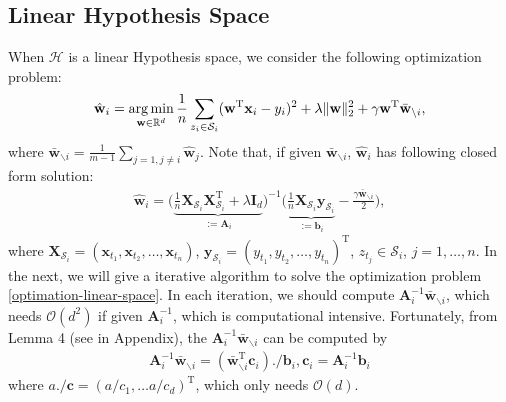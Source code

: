 \documentclass{article}
\newcommand{\argmin}{\operatornamewithlimits{arg\,min}}
\begin{document}
\subsection{Linear Hypothesis Space}
When $\mathcal{H}$ is a linear Hypothesis space,
we consider the following optimization problem:
\begin{align}
 \label{optimation-linear-space}
  \hat{\mathbf w}_i=\argmin_{\mathbf w\in\mathbb{R}^d}
  \frac{1}{n}\sum_{z_i\in\mathcal{S}_i}(\mathbf w^\mathrm{T}\mathbf x_i-y_i)^2+\lambda \|\mathbf w\|_2^2+ \gamma \mathbf w^\mathrm{T}\bar{\mathbf w}_{\backslash i},
\end{align}
where $\bar{\mathbf w}_{\backslash i}=\frac{1}{m-1}\sum_{j=1,j\not =i}\hat{\mathbf w}_j$.
Note that, if given $\bar{\mathbf w}_{\backslash i}$,  $\hat{\mathbf w}_i$ has following closed form solution:
\begin{align*}
  \hat{\mathbf w}_i=\Big(\underbrace{\frac{1}{n}\mathbf X_{\mathcal{S}_i}\mathbf X_{\mathcal{S}_i}^\mathrm{T}+\lambda \mathbf I_d}_{:=\mathbf A_i}\Big)^{-1}
  \Big(\underbrace{\frac{1}{n}\mathbf X_{\mathcal{S}_i}\mathbf y_{\mathcal{S}_i}}_{:=\mathbf b_i}- \frac{\gamma\bar{\mathbf w}_{\backslash i}}{2}\Big),
\end{align*}
where $\mathbf X_{\mathcal{S}_i}=(\mathbf x_{t_1},\mathbf x_{t_2},\ldots, \mathbf x_{t_n})$,
$\mathbf y_{\mathcal{S}_i}=(y_{t_1},y_{t_2},\ldots,y_{t_n})^\mathrm{T}$, $z_{t_j}\in \mathcal{S}_i$, $j=1,\ldots, n$.
In the next, we will give a iterative algorithm to
solve the optimization problem \eqref{optimation-linear-space}.
In each iteration, we should compute $\mathbf A_i^{-1}\bar{\mathbf w}_{\backslash i}$,
which needs $\mathcal{O}\left(d^2\right)$ if given $\mathbf A_i^{-1}$,
which is computational intensive.
Fortunately, %
from Lemma 4  (see in Appendix), the $\mathbf A_i^{-1}\bar{\mathbf w}_{\backslash i}$ can be computed by
\begin{align*}
  \mathbf A_i^{-1}\bar{\mathbf w}_{\backslash i}=
  \left(\bar{\mathbf w}_{\backslash i}^\mathrm{T}\mathbf c_i\right)./\mathbf b_i, \mathbf c_i=\mathbf A_i^{-1}\mathbf b_i
\end{align*}
where $a./\mathbf c=(a/c_1,\ldots a/c_d)^\mathrm{T}$, which only needs $\mathcal{O}(d)$.
\end{document}
